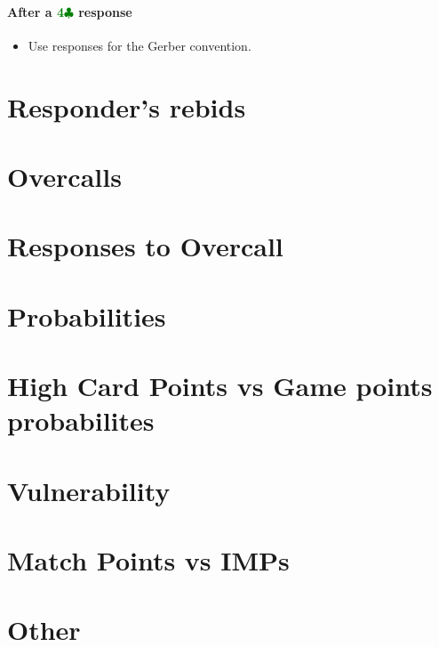 \documentclass{article}
\newcommand{\Cs}{\textcolor{Green}{$\clubsuit$}}
\newcommand{\C}[1]{\textcolor{Green}{\textbf{#1}\Cs}}
\begin{document}
\paragraph{After a \C{4} response}

\begin{itemize}
\item Use responses for the Gerber convention.
\end{itemize}

\section{Responder's rebids}


\section{Overcalls}
\section{Responses to Overcall}

\section{Probabilities}
\section{High Card Points vs Game points probabilites}
\section{Vulnerability}
\section{Match Points vs IMPs}
\section{Other}
\end{document}

